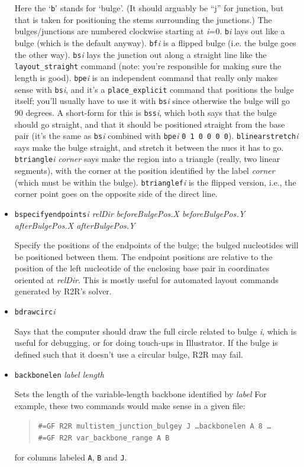 \documentclass[letterpaper,12pt]{report}
\newcommand{\example}[1]{
\begin{quote}
{\raggedright
#1
}
\end{quote}
}
\newcommand{\examplett}[1]{
\example{{\tt #1}}
}
\begin{document}
\begin{itemize}
Here the {\textquoteleft}{\tt b}{\textquoteright} stands for
{\textquoteleft}bulge{\textquoteright}.
(It should arguably be ``j'' for junction, but that is taken for positioning
the stems surrounding the junctions.)
The bulges/junctions are numbered clockwise starting at
\textit{i}=0.
{\tt b}\textit{i}
lays out like a bulge (which is the default anyway). {\tt bf}\textit{i}
is a flipped bulge (i.e. the bulge goes the other way). {\tt bs}\textit{i}
lays the junction out along a straight line like the {\tt layout\_straight}
command (note: you{\textquoteright}re responsible for making sure the
length is good).  {\tt bpe}\textit{i} is an independent command that really only
makes sense with {\tt bs}\textit{i}, and it{\textquoteright}s a
{\tt place\_explicit} command that positions the bulge itself;
you{\textquoteright}ll usually have to use it with {\tt bs}\textit{i} since
otherwise the bulge will go 90 degrees.  A short-form for this is
{\tt bss}\textit{i}, which both says that the bulge should go straight, and
that it should be positioned straight from the base pair
(it{\textquoteright}s the same as {\tt bs}\textit{i} combined with
{\tt bpe}\textit{i} {\tt 0 1 0 0 0 0}). {\tt blinearstretch}\textit{i} says make the
bulge straight, and stretch it between the nucs it has to go. 
{\tt btriangle}\textit{i}  \textit{corner} says make the region into a
triangle (really, two linear segments), with the corner at the position
identified by the label \textit{corner }(which must be within the
bulge).  {\tt btrianglef}\textit{i} is the
flipped version, i.e., the corner point goes on the opposite side of
the direct line.
\item
{\tt bspecifyendpoints}\textit{i  relDir  beforeBulgePos.X
beforeBulgePos.Y  afterBulgePos.X afterBulgePos.Y}

Specify the positions of the endpoints of the bulge; the bulged
nucleotides will be positioned between them. The endpoint positions are
relative to the position of the left nucleotide of the enclosing base
pair in coordinates oriented at \textit{relDir}.  This is mostly useful for automated layout commands
generated by R2R's solver.
\item
{\tt bdrawcirc}\textit{i}

Says that the computer should draw the full circle related to bulge
\textit{i}, which is useful for debugging, or for doing touch-ups in
Illustrator.  If the bulge is defined such that it doesn{\textquoteright}t use a circular
bulge, R2R may fail.
\item
{\tt backbonelen} \textit{label  length}

Sets the length of the variable-length backbone identified by {\it label}  For example, these two commands would make sense in a given file:
\examplett{\#=GF R2R multistem\_junction\_bulgey J \dots backbonelen A 8
\dots\\
\#=GF R2R var\_backbone\_range A B
}
for columns labeled {\tt A}, {\tt B} and {\tt J}.
\end{itemize}
\end{document}
